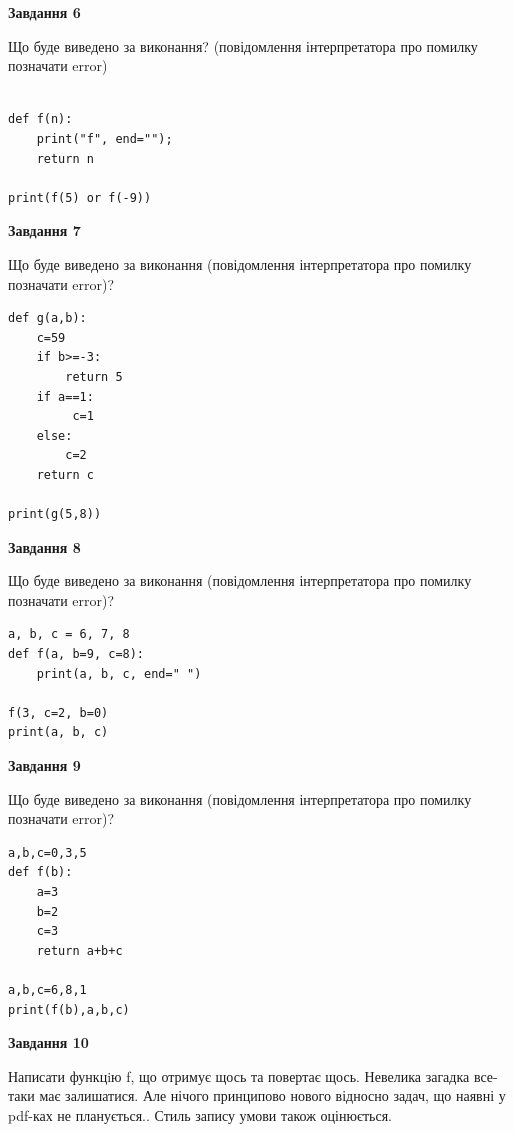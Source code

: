 \documentclass[12pt, ukrainian]{article}
\begin{document}
{\begin {large}
{\begin {center}\textbf{Завдання 6}\end {center}}

Що буде виведено за виконання? (повідомлення інтерпретатора про помилку позначати error)\par
\begin{verbatim}

def f(n):
    print("f", end="");
    return n

print(f(5) or f(-9))
\end{verbatim}

{\begin {center}\textbf{Завдання 7}\end {center}}

Що буде виведено за виконання (повідомлення інтерпретатора про помилку позначати error)?\par
\begin{verbatim}
def g(a,b):
    c=59
    if b>=-3:
        return 5
    if a==1:
         c=1
    else: 
        c=2
    return c

print(g(5,8))
\end{verbatim}

{\begin {center}\textbf{Завдання 8}\end {center}}

Що буде виведено за виконання (повідомлення інтерпретатора про помилку позначати error)?\par
\begin{verbatim}
a, b, c = 6, 7, 8
def f(a, b=9, c=8):
    print(a, b, c, end=" ")

f(3, c=2, b=0)
print(a, b, c)
\end{verbatim}

{\begin {center}\textbf{Завдання 9}\end {center}}

Що буде виведено за виконання (повідомлення інтерпретатора про помилку позначати error)?\par
\begin{verbatim}
a,b,c=0,3,5
def f(b):
    a=3
    b=2
    c=3
    return a+b+c

a,b,c=6,8,1
print(f(b),a,b,c)
\end{verbatim}

{\begin {center}\textbf{Завдання 10}\end {center}}


Написати функцiю f, що отримує щось та повертає щось. Невелика загадка все-таки має залишатися. Але нічого принципово нового відносно задач, що наявні у pdf-ках не планується.. Стиль запису умови також оцінюється.\par
\end {large}}
\newpage
\end{document}
